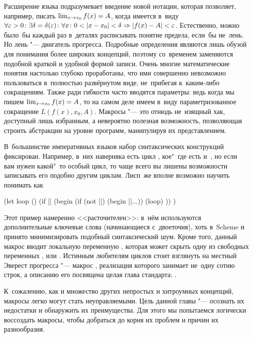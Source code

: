 \begingroup
\def\={=\nobreak\discretionary{}{\hbox{\ensuremath{=}}}{}}
Расширение языка подразумевает введение новой нотации, которая позволяет,
например, писать $\lim_{x \to x_0} f(x) \= A$, когда имеется в~виду $\forall
\epsilon > 0\colon \exists \delta \= \delta(\epsilon)\colon \forall x\colon
0 < |x - x_0| < \delta \Rightarrow |f(x) - A| < \epsilon$. Естественно,
можно было~бы каждый раз в~деталях расписывать понятие предела, если~бы не~лень.
Но лень "--- двигатель прогресса. Подробные определения являются лишь обузой
для понимания более широких концепций, поэтому со~временем заменяются подобной
краткой и удобной формой записи. Очень многие математические понятия настолько
глубоко проработаны, что ими совершенно невозможно пользоваться в~полностью
развёрнутом виде, не~прибегая к~каким-либо сокращениям. Также ради гибкости
часто вводятся параметры: ведь когда мы пишем $\lim_{x \to x_0} f(x) \= A$, то
на самом деле имеем в~виду параметризованное сокращение $L(f(x), x_0, A)$.
Макросы "--- это отнюдь не~изящный хак, доступный лишь избранным, а невероятно
полезная возможность, позволяющая строить абстракции на уровне программ,
манипулируя их представлением.
\endgroup

В~большинстве императивных языков набор синтаксических конструкций фиксирован.
Например, в~них наверняка есть цикл , кое"~где есть и~, но
если вам нужен какой"~то особый цикл, то чаще всего вы лишены возможности
записывать его подобно другим циклам. Лисп~же вполне возможно научить понимать
 как

\begin{code:lisp}
(let loop ()
  (if || (begin (if (not ||) (begin ||...))
               (loop) )) )
\end{code:lisp}

Этот пример намеренно <<расточителен>>: в~нём используются дополнительные
ключевые слова (начинающиеся с~двоеточия), хоть в~Scheme и принято
минимизировать подобный синтаксический шум.  Кроме того,
данный макрос вводит локальную переменную , которая может скрыть одну
из свободных переменных ,  или . Истинным любителям циклов
стоит взглянуть на местный Эверест прогресса "--- макрос , реализация
которого занимает не~одну сотню строк, а описанию его посвящена целая глава
стандарта: \cite[глава~26]{ste90}.

К~сожалению, как и множество других непростых и хитроумных концепций, макросы
легко могут стать неуправляемыми. Цель данной главы "--- осознать их недостатки
и обнаружить их преимущества. Для этого мы попытаемся логически воссоздать
макросы, чтобы добраться до корня их проблем и причин их разнообразия.


